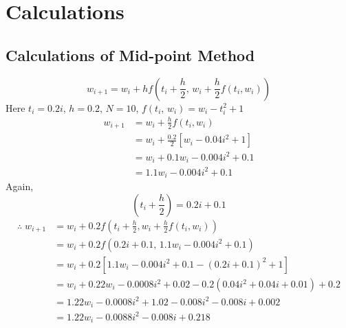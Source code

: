 \documentclass[../main-sheet.tex]{subfiles}
\begin{document}
\chapter{Calculations}\label{app}
\section{Calculations of Mid-point Method}
\[
    w_{i+1}=w_i+hf\left( t_i+\frac{h}{2},\,w_i+\frac{h}{2}f(t_i,w_i) \right)
\]
Here \(t_i=0.2i\), \(h=0.2\), \(N=10\), \(f(t_i,\,w_i)=w_i-t_i^2+1\)
\begin{align*}
    w_{i+1}&=w_i+\frac{h}{2}f(t_i,w_i)\\
    &=w_i+\frac{0.2}{2}\left[w_i-0.04i^2+1\right]\\
    &=w_i+0.1w_i-0.004i^2+0.1\\
    &=1.1w_i-0.004i^2+0.1
\end{align*}
Again,
\[
    \left( t_i+\frac{h}{2} \right)=0.2i+0.1
\]
\begin{align*}
    \therefore \; w_{i+1}&=w_i+0.2 f\left( t_i+\frac{h}{2},w_i+\frac{h}{2}f(t_i,w_i) \right)\\
    &=w_i+0.2 f\left( 0.2i+0.1,\, 1.1w_i-0.004i^2+0.1 \right)\\
    &=w_i+0.2 \left[ 1.1w_i-0.004i^2+0.1-(0.2i+0.1)^2+1 \right]\\
    &=w_i+0.22w_i-0.0008i^2+0.02-0.2(0.04i^2+0.04i+0.01)+0.2 \\
    &=1.22w_i-0.0008i^2+1.02-0.008i^2-0.008i+0.002 \\
    &=1.22w_i-0.0088i^2-0.008i+0.218
\end{align*}
\end{document}
